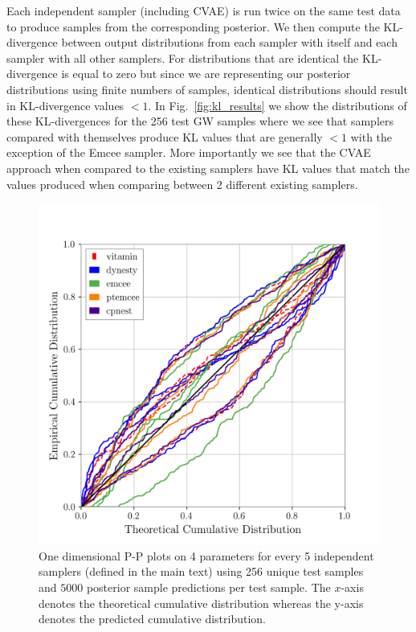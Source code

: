 \documentclass[%
showpacs,
 amsmath,amssymb,
 aps,
 twocolumn,
 prl,
 reprint,
floatfix,
]{revtex4-1}
\newcommand{\chris}[1]{\textbf{\textcolor{red}{CHRIS: #1}}}
\begin{document}
%
%
Each independent sampler (including \ac{CVAE}) is run twice on the same test
data to produce samples from the corresponding posterior. We then compute the
\ac{KL}-divergence between output distributions from each sampler with itself and
each sampler with all other samplers. For distributions that are identical the
KL-divergence is equal to zero but since we are representing our posterior
distributions using finite numbers of samples, identical distributions should
result in KL-divergence values $<1$. In Fig.~\ref{fig:kl_results} we show the
distributions of these KL-divergences for the 256 test \ac{GW} samples where
we see that samplers compared with themselves produce KL values that are
generally $<1$ with the exception of the Emcee sampler. More importantly we see
that the \ac{CVAE} approach when compared to the existing samplers have KL
values that match the values produced when comparing between 2 different
existing samplers.

%
%
\begin{figure}
    \includegraphics[width=\columnwidth]{images/latest_pp_plot.png}
    \caption{\label{fig:pp_plot} One dimensional P-P plots on 4 parameters 
    for every 5 independent samplers 
    (defined in the main text) using 256
unique test samples and $5000$ posterior sample predictions per test sample.
The $x$-axis denotes the theoretical cumulative distribution whereas the y-axis
denotes the predicted cumulative distribution.
} %
\end{figure}
%
\end{document}
